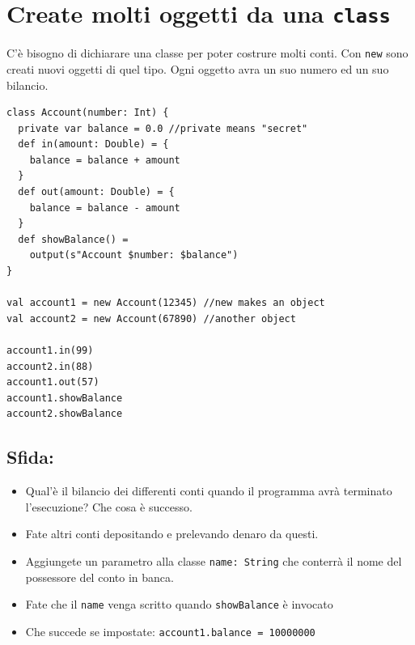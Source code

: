 \chapter{Create molti oggetti da una \lstinline{class}}
\begin{multicols}{2}
C'è bisogno di dichiarare una classe per poter costrure molti conti. Con \lstinline{new} sono creati nuovi oggetti di quel tipo. Ogni oggetto avra un suo numero ed un suo bilancio.

\begin{lstlisting}[basicstyle={\ttfamily\fontsize{13}{16}\selectfont},numbers=none]
class Account(number: Int) {
  private var balance = 0.0 //private means "secret"  
  def in(amount: Double) = {
    balance = balance + amount
  }
  def out(amount: Double) = {
    balance = balance - amount
  }
  def showBalance() = 
    output(s"Account $number: $balance")
}

val account1 = new Account(12345) //new makes an object
val account2 = new Account(67890) //another object

account1.in(99)
account2.in(88)
account1.out(57)
account1.showBalance
account2.showBalance
\end{lstlisting}
        


\columnbreak


\section*{\color{BrickRed}Sfida:}


\begin{itemize}

\item {Qual'è il bilancio dei differenti conti quando il programma avrà terminato l'esecuzione? Che cosa è successo.}
\item {Fate altri conti depositando e prelevando denaro da questi.}
\item {Aggiungete un parametro alla classe \lstinline{name: String} che conterrà il nome del possessore del conto in banca.}
\item {Fate che il \lstinline{name} venga scritto quando \lstinline{showBalance} è invocato}
\item {Che succede se impostate: \lstinline{account1.balance = 10000000 }}

\end{itemize}


\end{multicols}

